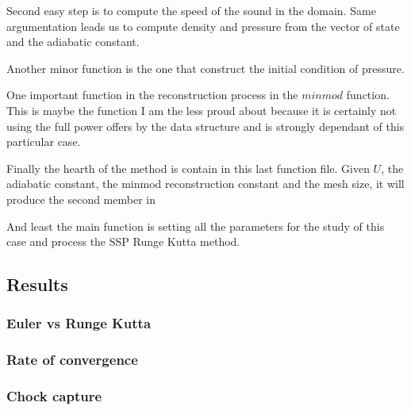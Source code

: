\documentclass[a4paper,12pt]{article}
\begin{document}
Second easy step is to compute the speed of the sound in the domain. Same argumentation leads us to compute density and pressure from the vector of state and the adiabatic constant. 



Another minor function is the one that construct the initial condition of pressure. 


One important function in the reconstruction process in the $minmod$ function. This is maybe the function I am the less proud about because it is certainly not using the full power offers by the data structure and is strongly dependant of this particular case. 



Finally the hearth of the method is contain in this last function file. Given $U$, the adiabatic constant, the minmod reconstruction constant and the mesh size, it will produce the second member in



And least the main function is setting all the parameters for the study of this case and process the SSP Runge Kutta method. 



\subsection{Results}
\subsubsection{Euler vs Runge Kutta}
\subsubsection{Rate of convergence}
\subsubsection{Chock capture}
\end{document}
